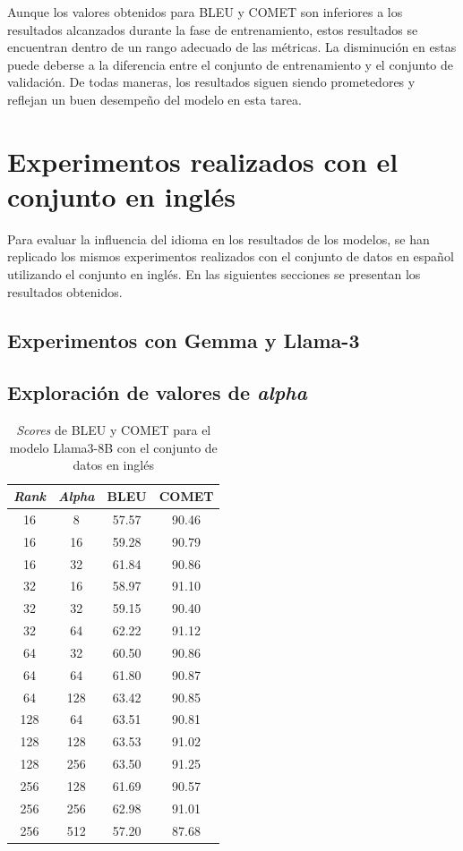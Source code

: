 \documentclass[11pt,spanish,listoffigures,listoftables]{tfgetsinf}
\begin{document}
Aunque los valores obtenidos para BLEU y COMET son inferiores a los resultados alcanzados durante la fase de entrenamiento, estos resultados se encuentran dentro de un rango adecuado de las métricas. La disminución en estas puede deberse a la diferencia entre el conjunto de entrenamiento y el conjunto de validación. De todas maneras, los resultados siguen siendo prometedores y reflejan un buen desempeño del modelo en esta tarea.

\section{Experimentos realizados con el conjunto en inglés}

Para evaluar la influencia del idioma en los resultados de los modelos, se han replicado los mismos experimentos realizados con el conjunto de datos en español utilizando el conjunto en inglés. En las siguientes secciones se presentan los resultados obtenidos.

\subsection{Experimentos con Gemma y Llama-3}

\subsection{Exploración de valores de \textit{alpha}}

\begin{table}[!h]
\caption{\textit{Scores} de BLEU y COMET para el modelo Llama3-8B con el conjunto de datos en inglés}
\begin{center}
\begin{tabular}{ c c | c c }
	\hline
	\textit{Rank} & \textit{Alpha} & BLEU & COMET \\
	\hline
	\hline
	16 & 8 & 57.57 & 90.46 \\
	16 & 16 & 59.28 & 90.79 \\
	16 & 32 & 61.84 & 90.86 \\
	\hline
	32 & 16 & 58.97 & 91.10 \\
	32 & 32 & 59.15 & 90.40 \\
	32 & 64 &  62.22 & 91.12 \\
	\hline
	64 & 32 & 60.50 & 90.86\\
	64 & 64 & 61.80 & 90.87\\
	64 & 128 & 63.42 & 90.85\\
	\hline
	128 & 64 & 63.51 & 90.81\\
	128 & 128 & 63.53 & 91.02\\
	128 & 256 & 63.50 & 91.25\\
	\hline
	256 & 128 & 61.69 & 90.57\\
	256 & 256 & 62.98 & 91.01\\
	256 & 512 & 57.20 & 87.68\\	

\end{tabular}
\end{center}
\label{tab: Llama exploración de alpha}
\end{table}
\end{document}
